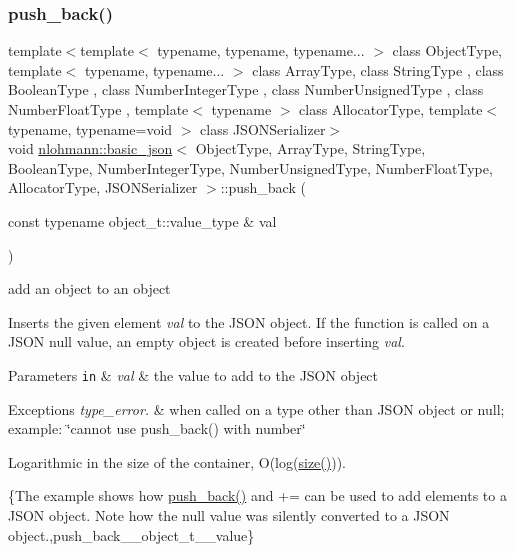 \subsubsection{\texorpdfstring{push\+\_\+back()}{push\_back()}\hspace{0.1cm}{\footnotesize\ttfamily [3/4]}}
{\footnotesize\ttfamily template$<$template$<$ typename, typename, typename... $>$ class Object\+Type, template$<$ typename, typename... $>$ class Array\+Type, class String\+Type , class Boolean\+Type , class Number\+Integer\+Type , class Number\+Unsigned\+Type , class Number\+Float\+Type , template$<$ typename $>$ class Allocator\+Type, template$<$ typename, typename=void $>$ class J\+S\+O\+N\+Serializer$>$ \\
void \hyperlink{classnlohmann_1_1basic__json}{nlohmann\+::basic\+\_\+json}$<$ Object\+Type, Array\+Type, String\+Type, Boolean\+Type, Number\+Integer\+Type, Number\+Unsigned\+Type, Number\+Float\+Type, Allocator\+Type, J\+S\+O\+N\+Serializer $>$\+::push\+\_\+back (\begin{DoxyParamCaption}\item[{const typename object\+\_\+t\+::value\+\_\+type \&}]{val }\end{DoxyParamCaption})\hspace{0.3cm}{\ttfamily [inline]}}



add an object to an object 

Inserts the given element {\itshape val} to the J\+S\+ON object. If the function is called on a J\+S\+ON null value, an empty object is created before inserting {\itshape val}.


\begin{DoxyParams}[1]{Parameters}
\mbox{\tt in}  & {\em val} & the value to add to the J\+S\+ON object\\
\hline
\end{DoxyParams}

\begin{DoxyExceptions}{Exceptions}
{\em type\+\_\+error.} & when called on a type other than J\+S\+ON object or null; example\+: {\ttfamily \char`\"{}cannot use push\+\_\+back() with number\char`\"{}}\\
\hline
\end{DoxyExceptions}
Logarithmic in the size of the container, O(log({\ttfamily \hyperlink{classnlohmann_1_1basic__json_a25e27ad0c6d53c01871c5485e1f75b96}{size()}})).

\{The example shows how {\ttfamily \hyperlink{classnlohmann_1_1basic__json_ac8e523ddc8c2dd7e5d2daf0d49a9c0d7}{push\+\_\+back()}} and {\ttfamily +=} can be used to add elements to a J\+S\+ON object. Note how the {\ttfamily null} value was silently converted to a J\+S\+ON object.,push\+\_\+back\+\_\+\+\_\+object\+\_\+t\+\_\+\+\_\+value\}

